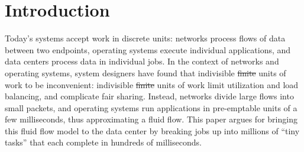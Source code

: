 \section{Introduction}
Today's systems accept work in discrete units: networks process flows of data
between two endpoints, operating systems execute individual applications, and
data centers process data in individual jobs.  In the context of networks and
operating systems, system designers have found that indivisible \st{finite} units of work to be
inconvenient: indivisible \st{finite} units of work limit utilization and load balancing,
and complicate fair sharing.  Instead, networks divide large flows into small
packets, and operating systems run applications in pre-emptable units of a 
few milliseconds, thus approximating a fluid flow.  This paper argues for
bringing this fluid flow model  to the data center by breaking jobs up into
millions of ``tiny tasks'' that each complete in hundreds of milliseconds.

